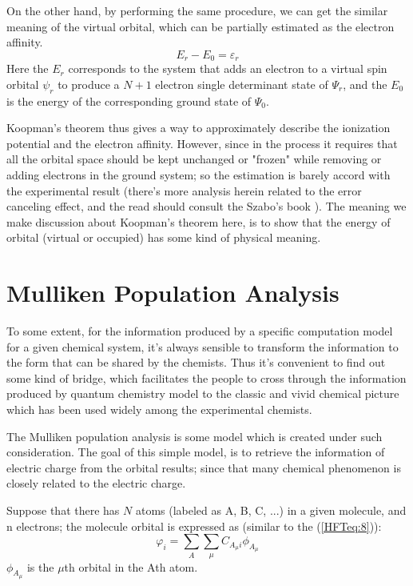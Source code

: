 On the other hand, by performing the same procedure, we can get the
similar meaning of the virtual orbital, which can be partially
estimated as the electron affinity.
\begin{equation}\label{}
E_{r} - E_{0}= \varepsilon_{r}
\end{equation}
Here the $E_{r}$ corresponds to the system that adds an electron to
a virtual spin orbital $\psi_{r}$ to produce a $N+1$ electron single
determinant state of $\Psi_{r}$, and the $E_{0}$ is the energy of
the corresponding ground state of $\Psi_{0}$.

Koopman's theorem thus gives a way to approximately describe the
ionization potential and the electron affinity. However, since in
the process it requires that all the orbital space should be kept
unchanged or "frozen" while removing or adding electrons in the
ground system; so the estimation is barely accord with the
experimental result (there's more analysis herein related to the
error canceling effect, and the read should consult the Szabo's book
). The meaning we make discussion about Koopman's theorem here, is
to show that the energy of orbital (virtual or occupied) has some
kind of physical meaning.

\section{Mulliken Population Analysis}
 To some extent, for the information produced
 by a specific computation model for a given chemical system, it's
 always sensible to transform the information to the form that can be shared
by the chemists. Thus it's convenient to find out some kind of bridge, which
facilitates the people to cross through the information produced by
quantum chemistry model to the classic and vivid chemical picture
which has been used widely among the experimental chemists.

The Mulliken population analysis is some model which is created
under such consideration. The goal of this simple model, is to
retrieve the information of electric charge from the orbital
results; since that many chemical phenomenon is closely related to
the electric charge.

Suppose that there has $N$ atoms (labeled as A, B, C, ...) in a
given molecule, and n electrons; the molecule orbital is expressed
as (similar to the (\ref{HFTeq:8})):
\begin{equation}\label{}
\varphi_{i} = \sum_{A}\sum_{\mu}C_{A_{\mu}i}\phi_{A_{\mu}}
\end{equation}
$\phi_{A_{\mu}}$ is the $\mu$th orbital in the Ath atom.


